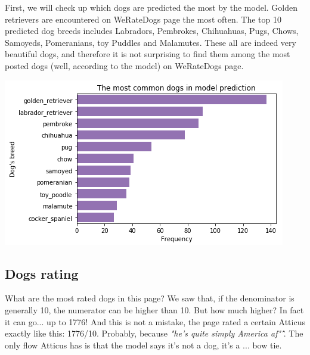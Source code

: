\documentclass{article}
\begin{document}
First, we will check up which dogs are predicted the most by the model. Golden retrievers are encountered on WeRateDogs page the most often. The top 10 predicted dog breeds includes Labradors, Pembrokes, Chihuahuas, Pugs, Chows, Samoyeds, Pomeranians, toy Puddles and Malamutes. These all are indeed very beautiful dogs, and therefore it is not surprising to find them among the most posted dogs (well, according to the model) on WeRateDogs page.

\begin{center}
    \includegraphics[scale=0.6]{preds.png}
\end{center}

\subsection{Dogs rating}

What are the most rated dogs in this page? We saw that, if the denominator is generally 10, the numerator can be higher than 10. But how much higher? In fact it can go... up to 1776! And this is not a mistake, the page rated a certain Atticus exactly like this: 1776/10. Probably, because \textit{"he's quite simply America af"} \^\^. The only flow Atticus has is that the model says it's not a dog, it's a ... bow tie.
\end{document}

